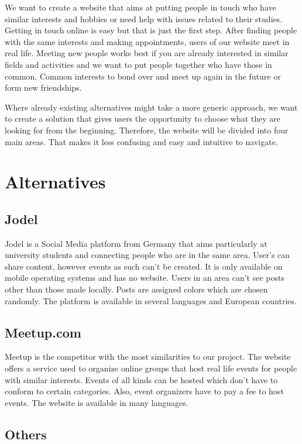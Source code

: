 \documentclass[conference]{IEEEtran}
\begin{document}
We want to create a website that aims at putting people in touch who have similar interests and hobbies or need help with issues related to their studies. 
Getting in touch online is easy but that is just the first step. 
After finding people with the same interests and making appointments, users of our website meet in real life. 
Meeting new people works best if you are already interested in similar fields and activities and we want to put people together who have those in common. 
Common interests to bond over and meet up again in the future or form new friendships.

Where already existing alternatives might take a more generic approach, we want to create a solution that gives users the opportunity to choose what they are looking for from the beginning. 
Therefore, the website will be divided into four main areas. 
That makes it less confusing and easy and intuitive to navigate.

\section{Alternatives}


\subsection{Jodel}

Jodel is a Social Media platform from Germany that aims particularly at university students and connecting people who are in the same area. 
User’s can share content, however events as such can’t be created. 
It is only available on mobile operating systems and has no website. 
Users in an area can’t see posts other than those made locally. 
Posts are assigned colors which are chosen randomly. 
The platform is available in several languages and European countries.

\subsection{Meetup.com}

 Meetup is the competitor with the most similarities to our project. 
 The website offers a service used to organize online groups that host real life events for people with similar interests. 
 Events of all kinds can be hosted which don’t have to conform to certain categories. 
 Also, event organizers have to pay a fee to host events. 
 The website is available in many languages.

\subsection{Others}
\end{document}
